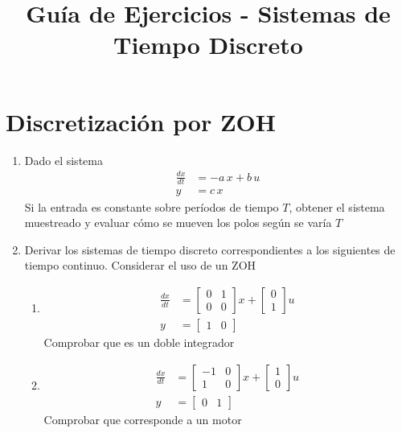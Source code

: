 \documentclass[a4paper,12pt]{article}
\title{Guía de Ejercicios - Sistemas de Tiempo Discreto}
\author{}
\begin{document}
\maketitle

\section{Discretización por ZOH}

\begin{enumerate}
	\item Dado el sistema
	      \begin{align*}
		      \frac{dx}{dt} & =-a\, x + b\,u \\
		      y             & = c\, x
	      \end{align*}
	      Si la entrada es constante sobre períodos de tiempo $T$, obtener el sistema muestreado y evaluar cómo se mueven los polos según se varía $T$


	\item Derivar los sistemas de tiempo discreto correspondientes a los siguientes de tiempo continuo. Considerar el uso de un ZOH

	      \begin{enumerate}
		      \item
		            \begin{align*}
			            \frac{dx}{dt} & = \begin{bmatrix}
				                              0 & 1 \\ 0 & 0
			                              \end{bmatrix} x + \begin{bmatrix} 0\\1 \end{bmatrix} u \\
			            y             & = \begin{bmatrix}1 & 0 \end{bmatrix}
		            \end{align*}
		            Comprobar que es un doble integrador
		      \item
		            \begin{align*}
			            \frac{dx}{dt} & = \begin{bmatrix}
				                              -1 & 0 \\ 1 & 0
			                              \end{bmatrix} x + \begin{bmatrix} 1\\0 \end{bmatrix} u \\
			            y             & = \begin{bmatrix}0 & 1 \end{bmatrix}
		            \end{align*}
		            Comprobar que corresponde a un motor


\end{enumerate}
\end{enumerate}
\end{document}
